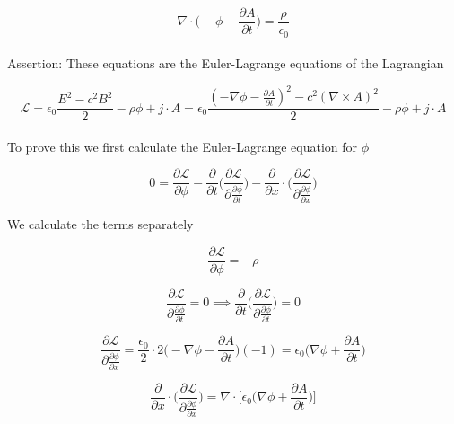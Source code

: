 \documentclass{article}
\begin{document}
\begin{equation} \label{MaxwellAPhi2}
\nabla \cdot \bigg( -\phi - \frac{\partial A}{\partial t} \bigg) = \frac{\rho}{\epsilon_0} 
\end{equation}
\\

Assertion: These equations are the Euler-Lagrange equations of the Lagrangian

\begin{equation}
\mathcal{L} = \epsilon_0 \frac{E^2 - c^2 B^2}{2} - \rho\phi + j \cdot A
= \epsilon_0 \frac{(-\nabla\phi - \frac{\partial A}{\partial t})^2 - c^2 (\nabla \times A)^2}{2} - \rho\phi + j \cdot A
\end{equation}
\\

To prove this we first calculate the Euler-Lagrange equation for $\phi$

\begin{equation} \label{ELPhi}
0 = \frac{\partial \mathcal{L}}{\partial \phi}
-\frac{\partial}{\partial t} \bigg( \frac{\partial \mathcal{L}}{\partial \frac{\partial \phi}{\partial t}} \bigg) 
-\frac{\partial}{\partial x} \cdot \bigg( \frac{\partial \mathcal{L}}{\partial \frac{\partial \phi}{\partial x}} \bigg) 
\end{equation}

We calculate the terms separately

\begin{equation}
\frac{\partial \mathcal{L}}{\partial \phi} = -\rho
\end{equation}

\begin{equation}
\frac{\partial \mathcal{L}}{\partial \frac{\partial \phi}{\partial t}} = 0 
\implies \frac{\partial}{\partial t} \bigg( \frac{\partial \mathcal{L}}{\partial \frac{\partial \phi}{\partial t}}\bigg) = 0 
\end{equation}



\begin{equation}
\frac{\partial \mathcal{L}}{\partial \frac{\partial \phi}{\partial x}} 
= \frac{\epsilon_0}{2} \cdot 2 \bigg(-\nabla \phi - \frac{\partial A}{\partial t} \bigg) (-1) 
= \epsilon_0 \bigg(\nabla \phi + \frac{\partial A}{\partial t} \bigg)
\end{equation}

\begin{equation}
\frac{\partial}{\partial x} \cdot \bigg(\frac{\partial \mathcal{L}}{\partial \frac{\partial \phi}{\partial x}} \bigg) 
= \nabla \cdot \bigg[\epsilon_0 \bigg(\nabla \phi + \frac{\partial A}{\partial t} \bigg)\bigg]
\end{equation}
\end{document}
